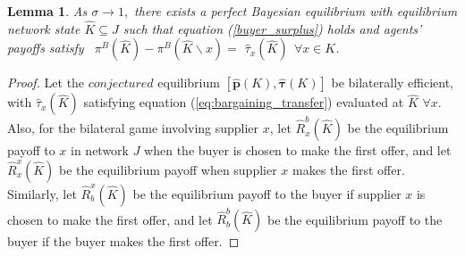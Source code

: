 \documentclass[12pt]{article} \usepackage{amsmath,amssymb,amsthm,geometry,graphicx,setspace,algorithm,algpseudocode,float}
\newtheorem{lemma}{Lemma}[section]
\begin{document}
\linespread{1.0} 
\begin{lemma}
As $\sigma \rightarrow 1,$ there exists a perfect Bayesian equilibrium with equilibrium network state $\hat{K}\subseteq J$ such that equation (\ref{buyer_surplus}) holds and agents' payoffs satisfy
\ $\pi ^{B}(\hat{K})-\pi ^{B}(\hat{K}\backslash x) = $ $\hat{\tau}_{x}(\hat{K}) \ \ \forall x \in K$. %
\label{lemma2}
\end{lemma}
\linespread{1.5} 
\begin{proof}
Let the $conjectured$ equilibrium $[\mathbf{\hat{p}}(K),\mathbf{\hat{\tau}}(K)]
$ be bilaterally efficient, with
$\hat{\tau}_{x}(\hat{K})$ satisfying equation (\ref{eq:bargaining_transfer}) evaluated at $\hat{K}$ $ \forall x.\ \ $
Also, for the bilateral game involving supplier $x$, let $\hat{R}_{x}^{b}(\hat{K})$ be the equilibrium payoff to $x$ in network $J$ when the buyer is chosen to make the first offer, and let $\hat{R}_{x}^{x}(\hat{K})$ be the equilibrium payoff when supplier $x$ makes the first offer. Similarly, let $\hat{R}_{b}^{x}(\hat{K})$
be the equilibrium payoff to the buyer if supplier $x$ is chosen to make the first offer, and let $\hat{R}_{b}^{b}(\hat{K})$ be the equilibrium payoff to the buyer if the buyer makes the first offer.


\end{proof}
\end{document}
